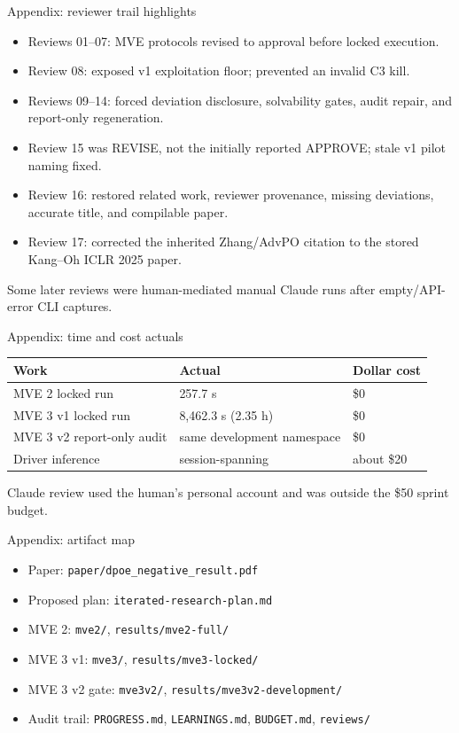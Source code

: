 \documentclass[aspectratio=169,10pt]{beamer}
\begin{document}
\begin{frame}{Appendix: reviewer trail highlights}
\small
\begin{itemize}
  \item Reviews 01--07: MVE protocols revised to approval before locked execution.
  \item Review 08: exposed v1 exploitation floor; prevented an invalid C3 kill.
  \item Reviews 09--14: forced deviation disclosure, solvability gates, audit repair, and report-only regeneration.
  \item Review 15 was REVISE, not the initially reported APPROVE; stale v1 pilot naming fixed.
  \item Review 16: restored related work, reviewer provenance, missing deviations, accurate title, and compilable paper.
  \item Review 17: corrected the inherited Zhang/AdvPO citation to the stored Kang--Oh ICLR 2025 paper.
\end{itemize}
Some later reviews were human-mediated manual Claude runs after empty/API-error CLI captures.
\end{frame}

\begin{frame}{Appendix: time and cost actuals}
\small
\begin{tabular}{p{}p{}p{}}
\toprule
Work & Actual & Dollar cost \\
\midrule
MVE 2 locked run & 257.7 s & \$0 \\
MVE 3 v1 locked run & 8,462.3 s (2.35 h) & \$0 \\
MVE 3 v2 report-only audit & same development namespace & \$0 \\
Driver inference & session-spanning & about \$20 \\
\bottomrule
\end{tabular}
\par\vspace{1em}
Claude review used the human's personal account and was outside the \$50 sprint budget.
\end{frame}

\begin{frame}{Appendix: artifact map}
\small
\begin{itemize}
  \item Paper: \texttt{paper/dpoe\_negative\_result.pdf}
  \item Proposed plan: \texttt{iterated-research-plan.md}
  \item MVE 2: \texttt{mve2/}, \texttt{results/mve2-full/}
  \item MVE 3 v1: \texttt{mve3/}, \texttt{results/mve3-locked/}
  \item MVE 3 v2 gate: \texttt{mve3v2/}, \texttt{results/mve3v2-development/}
  \item Audit trail: \texttt{PROGRESS.md}, \texttt{LEARNINGS.md}, \texttt{BUDGET.md}, \texttt{reviews/}
\end{itemize}
\end{frame}
\end{document}
